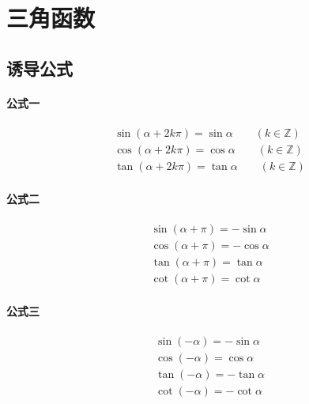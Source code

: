 \documentclass[a4paper, 12pt, draft]{article}
\begin{document}
    \newpage
    \section{三角函数}
    \subsection{诱导公式}

    \paragraph{公式一}
    \begin{equation}
        \begin{aligned}
            &\sin{(\alpha + 2k\pi)} = \sin{\alpha} \qquad (k \in \mathbb{Z} ) \\
            &\cos{(\alpha + 2k\pi)} = \cos{\alpha} \qquad (k \in \mathbb{Z} ) \\
            &\tan{(\alpha + 2k\pi)} = \tan{\alpha} \qquad (k \in \mathbb{Z} )
        \end{aligned}
    \end{equation}

    \paragraph{公式二}
    \begin{equation}
        \begin{aligned}
            &\sin{(\alpha + \pi)} = -\sin{\alpha} \\
            &\cos{(\alpha + \pi)} = -\cos{\alpha} \\
            &\tan{(\alpha + \pi)} =  \tan{\alpha} \\
            &\cot{(\alpha + \pi)} =  \cot{\alpha}
        \end{aligned}
    \end{equation}

    \paragraph{公式三}
    \begin{equation}
        \begin{aligned}
            &\sin{(-\alpha)} = -\sin{\alpha} \\
            &\cos{(-\alpha)} =  \cos{\alpha} \\
            &\tan{(-\alpha)} =  -\tan{\alpha} \\
            &\cot{(-\alpha)} =  -\cot{\alpha}
        \end{aligned}
    \end{equation}
\end{document}
